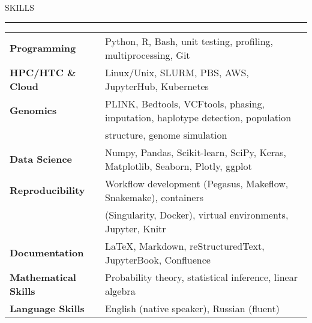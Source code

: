 \documentclass{resume} %
\renewenvironment{rSection}[1]{
\sectionskip
\textcolor{RoyalPurple}{\MakeUppercase{#1}}
\sectionlineskip
\hrule
\begin{list}{}{
\setlength{\leftmargin}{1.5em}
}
\item[]
}{
\end{list}
}
\begin{document}

\begin{rSection}{Skills}

\begin{tabular}{ @{} >{\bfseries}l @{\hspace{6ex}} l }
Programming & Python, R, Bash, unit testing, profiling, multiprocessing, Git\\
HPC/HTC \& Cloud & Linux/Unix, SLURM, PBS, AWS, JupyterHub, Kubernetes  \\
Genomics & PLINK, Bedtools, VCFtools, phasing, imputation, haplotype detection, population \\ & structure, genome simulation\\
Data Science & Numpy, Pandas, Scikit-learn, SciPy, Keras, Matplotlib, Seaborn, Plotly, ggplot \\
Reproducibility & Workflow development (Pegasus, Makeflow, Snakemake), containers \\ & (Singularity, Docker), virtual environments, Jupyter, Knitr \\
Documentation & \LaTeX, Markdown, reStructuredText, JupyterBook, Confluence \\
Mathematical Skills & Probability theory, statistical inference, linear algebra \\
Language Skills & English (native speaker), Russian (fluent) \\
\end{tabular}

\end{rSection}

\end{document}
